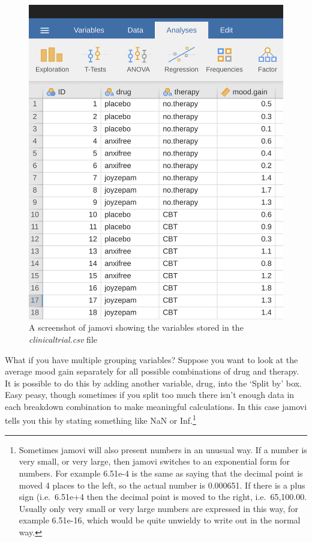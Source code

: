 \documentclass[
  a4paper,
]{book}
\begin{document}
\begin{figure}

\includegraphics[width=1\textwidth,height=\textheight]{images/fig4-13.png} \hfill{}

\caption{\label{fig-fig4-13}A screenshot of jamovi showing the variables
stored in the \emph{clinicaltrial.csv} file}

\end{figure}

What if you have multiple grouping variables? Suppose you want to look
at the average mood gain separately for all possible combinations of
drug and therapy. It is possible to do this by adding another variable,
drug, into the `Split by' box. Easy peasy, though sometimes if you split
too much there isn't enough data in each breakdown combination to make
meaningful calculations. In this case jamovi tells you this by stating
something like NaN or Inf.\footnote{Sometimes jamovi will also present
  numbers in an unusual way. If a number is very small, or very large,
  then jamovi switches to an exponential form for numbers. For example
  6.51e-4 is the same as saying that the decimal point is moved 4 places
  to the left, so the actual number is 0.000651. If there is a plus sign
  (i.e.~6.51e+4 then the decimal point is moved to the right,
  i.e.~65,100.00. Usually only very small or very large numbers are
  expressed in this way, for example 6.51e-16, which would be quite
  unwieldy to write out in the normal way.}
\end{document}
